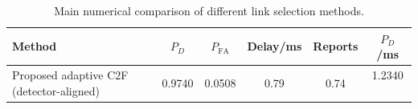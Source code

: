 \begin{table}[t]
    \centering
    \caption{Main numerical comparison of different link selection methods.}
    \label{tab:main_summary}
    \begin{tabular}{l c c c c c}
        \hline
        Method & $P_D$ & $P_{\mathrm{FA}}$ & Delay/ms & Reports & $P_D$/ms \\
        \hline
        Proposed adaptive C2F (detector-aligned) & 0.9740 & 0.0508 & 0.79 & 0.74 & 1.2340 \
        \hline
    \end{tabular}
\end{table}
